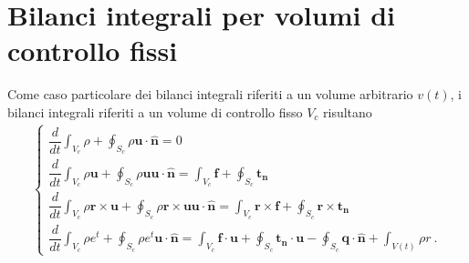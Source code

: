 \documentclass[letterpaper,10pt,italian]{jupyterBook}
\begin{document}
\section{Bilanci integrali per volumi di controllo fissi}
\label{\detokenize{polimi/fluidmechanics-ita/template/capitoli/04_bilanci/04teoria:bilanci-integrali-per-volumi-di-controllo-fissi}}
\sphinxAtStartPar
Come caso particolare dei bilanci integrali riferiti a un volume
arbitrario \(v(t)\), i bilanci integrali riferiti a un volume di controllo
fisso \(V_c\) risultano
\begin{equation*}
\begin{split}\begin{cases}
   \dfrac{d}{d t} \displaystyle\int_{V_c} \rho + \oint_{S_c} \rho \mathbf{u} \cdot \mathbf{\hat{n}} = 0 \\
   \dfrac{d}{d t} \displaystyle\int_{V_c} \rho  \mathbf{u}+ \oint_{S_c} \rho \mathbf{u} \mathbf{u} \cdot \mathbf{\hat{n}} = \int_{V_c} \mathbf{f} + \oint_{S_c} \mathbf{t_n} \\
   \dfrac{d}{d t} \displaystyle\int_{V_c} \rho \mathbf{r} \times \mathbf{u}+ \oint_{S_c} \rho \mathbf{r} \times \mathbf{u} \mathbf{u} \cdot \mathbf{\hat{n}} = \int_{V_c} \mathbf{r} \times \mathbf{f} + \oint_{S_c} \mathbf{r} \times \mathbf{t_n} \\
   \dfrac{d}{d t} \displaystyle\int_{V_c} \rho e^t + \oint_{S_c} \rho e^t \mathbf{u} \cdot \mathbf{\hat{n}} = \int_{V_c} \mathbf{f} \cdot \mathbf{u} + \oint_{S_c} \mathbf{t_n} \cdot \mathbf{u} - \oint_{S_c} \mathbf{q} \cdot \mathbf{\hat{n}} + \int_{V(t)} \rho r  \ .
 \end{cases}\end{split}
\end{equation*}
\end{document}
